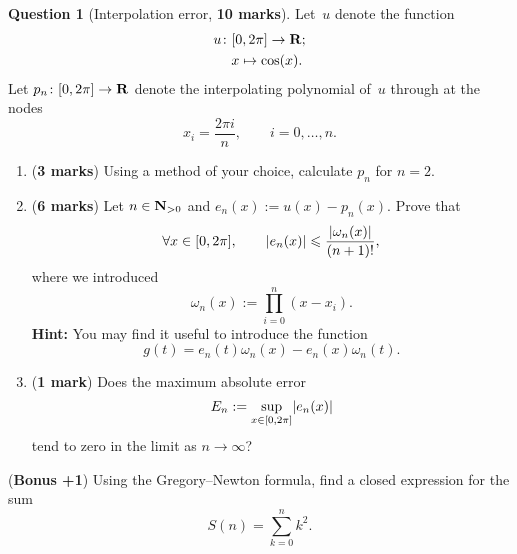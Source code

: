 \documentclass[11pt]{article}
\theoremstyle{definition}
\newtheorem{question}{Question}
\theoremstyle{remark}
\begin{document}
\newpage
\begin{question}
    [Interpolation error, \textbf{10 marks}]
    Let~$u$ denote the function
    \begin{align*}
        u\colon
        &[0, 2\pi] \to \mathbf R; \\
        &x \mapsto \cos(x).
    \end{align*}
    Let $p_n \colon [0, 2 \pi] \to \mathbf R$ denote the interpolating polynomial of~$u$ through at the nodes
    \[
        x_i = \frac{2 \pi i}{n}, \qquad i = 0, \dotsc, n.
    \]
    \begin{enumerate}
        \item
            (\textbf{3 marks})
            Using a method of your choice,
            calculate $p_n$ for $n = 2$.

        \item
            (\textbf{6 marks})
            Let $n \in \mathbf N_{>0}$ and $e_n(x) := u(x) - p_n(x)$.
            Prove that
            \[
                \forall x \in [0, 2\pi], \qquad
                \lvert e_n(x)\rvert
                \leqslant \frac{\lvert \omega_n(x) \rvert}{(n+1)!},
            \]
            where we introduced
            \[
                \omega_n(x) := \prod_{i=0}^{n} (x - x_i).
            \]
            \textbf{Hint:} You may find it useful to introduce the function
            \[
                g(t) = e_n(t) \omega_n(x) - e_n(x) \omega_n(t).
            \]

        \item
            (\textbf{1 mark}) Does the maximum absolute error
            \[
                E_n := \sup_{x \in [0, 2\pi]} \lvert e_n(x)\rvert
            \]
            tend to zero in the limit as $n \to \infty$?
    \end{enumerate}

    \noindent (\textbf{Bonus +1}) Using the Gregory--Newton formula,
    find a closed expression for the sum
    \[
        S(n) = \sum_{k=0}^{n} k^2.
    \]
\end{question}
\end{document}
